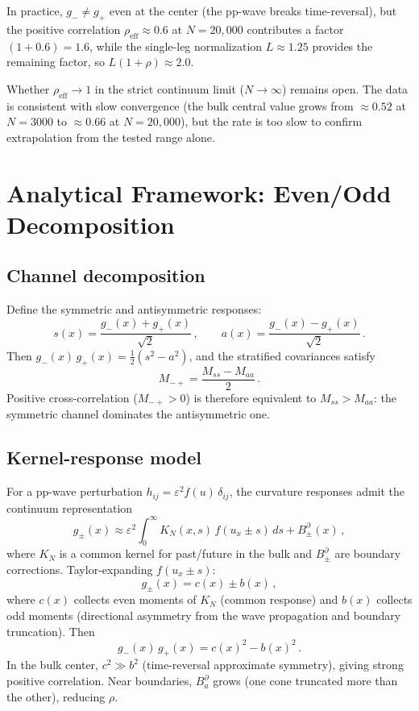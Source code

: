 \documentclass[11pt,a4paper]{article}
\begin{document}
In practice, $g_- \neq g_+$ even at the center (the pp-wave breaks time-reversal),
but the positive correlation $\rho_{\mathrm{eff}} \approx 0.6$ at $N = 20{,}000$
contributes a factor $(1 + 0.6) = 1.6$, while the single-leg normalization
$L \approx 1.25$ provides the remaining factor, so $L(1{+}\rho) \approx 2.0$.

Whether $\rho_{\mathrm{eff}} \to 1$ in the strict continuum limit
($N \to \infty$) remains open.  The data is consistent with slow convergence
(the bulk central value grows from $\approx 0.52$ at $N{=}3000$ to $\approx 0.66$ at $N{=}20{,}000$),
but the rate is too slow to confirm extrapolation from the tested range alone.

\section{Analytical Framework: Even/Odd Decomposition}

\subsection{Channel decomposition}

Define the symmetric and antisymmetric responses:
\[
  s(x) = \frac{g_-(x) + g_+(x)}{\sqrt{2}}\,,\qquad
  a(x) = \frac{g_-(x) - g_+(x)}{\sqrt{2}}\,.
\]
Then $g_-(x)\,g_+(x) = \frac{1}{2}(s^2 - a^2)$, and the stratified
covariances satisfy
\begin{equation}\label{eq:Mpm-decomp}
  M_{-+} = \frac{M_{ss} - M_{aa}}{2}\,.
\end{equation}
Positive cross-correlation ($M_{-+} > 0$) is therefore equivalent to
$M_{ss} > M_{aa}$: the symmetric channel dominates the antisymmetric one.

\subsection{Kernel-response model}

For a pp-wave perturbation $h_{ij} = \varepsilon^2 f(u)\,\delta_{ij}$,
the curvature responses admit the continuum representation
\[
  g_\pm(x) \approx \varepsilon^2
  \int_0^\infty K_N(x,s)\,f(u_x \pm s)\,ds + B_\pm^\partial(x)\,,
\]
where $K_N$ is a common kernel for past/future in the bulk and
$B_\pm^\partial$ are boundary corrections.  Taylor-expanding $f(u_x \pm s)$:
\[
  g_\pm(x) = c(x) \pm b(x)\,,
\]
where $c(x)$ collects even moments of $K_N$ (common response) and
$b(x)$ collects odd moments (directional asymmetry from the wave
propagation and boundary truncation).  Then
\[
  g_-(x)\,g_+(x) = c(x)^2 - b(x)^2\,.
\]
In the bulk center, $c^2 \gg b^2$ (time-reversal approximate symmetry),
giving strong positive correlation.  Near boundaries, $B_a^\partial$ grows
(one cone truncated more than the other), reducing $\rho$.
\end{document}
